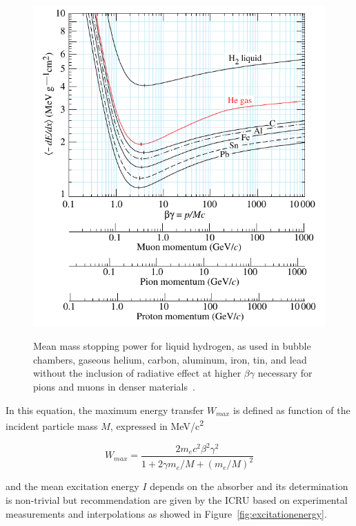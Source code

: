 	\begin{figure}[H]
		\centering
		\includegraphics[width = 0.8\plotwidth]{fig/chapt4/dedx_table_98.pdf}\\
		\caption{\label{fig:enerlyloss} Mean mass stopping power for liquid hydrogen, as used in bubble chambers, gaseous helium, carbon, aluminum, iron, tin, and lead without the inclusion of radiative effect at higher $\beta\gamma$ necessary for pions and muons in denser materials~\cite{PDG2018}.}
	\end{figure}
	
	In this equation, the maximum energy transfer $W_{max}$ is defined as function of the incident particle mass $M$, expressed in \si{MeV/c^2}
	
	\begin{equation}
	\label{eq:maxenergytrans}
	W_{max} = \frac{2m_ec^2\beta^2\gamma^2}{1 + 2\gamma m_e/M + (m_e/M)^2}
	\end{equation}
	
	and the mean excitation energy $I$ depends on the absorber and its determination is non-trivial but recommendation are given by the \acf{ICRU} based on experimental measurements and interpolations as showed in Figure~\ref{fig:excitationenergy}.
	
